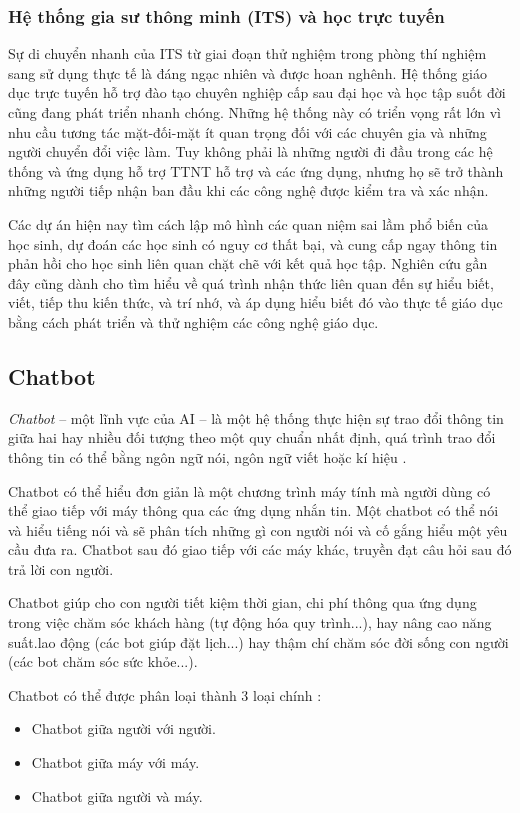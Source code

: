 \subsubsection{Hệ thống gia sư thông minh (ITS) và học trực tuyến}
Sự di chuyển nhanh của ITS từ giai đoạn thử nghiệm trong phòng thí nghiệm sang sử dụng thực tế là đáng ngạc nhiên và được hoan nghênh. Hệ thống giáo dục trực tuyến hỗ trợ đào tạo chuyên nghiệp cấp sau đại học và học tập suốt đời cũng đang phát triển nhanh chóng. Những hệ thống này có triển vọng rất lớn vì nhu cầu tương tác mặt-đối-mặt ít quan trọng đối với các chuyên gia và những người chuyển đổi việc làm. Tuy không phải là những người đi đầu trong các hệ thống và ứng dụng hỗ trợ TTNT hỗ trợ và các ứng dụng, nhưng họ sẽ trở thành những người tiếp nhận ban đầu khi các công nghệ được kiểm tra và xác nhận.\par
Các dự án hiện nay tìm cách lập mô hình các quan niệm sai lầm phổ biến của học sinh, dự đoán các học sinh có nguy cơ thất bại, và cung cấp ngay thông tin phản hồi cho học sinh liên quan chặt chẽ với kết quả học tập. Nghiên cứu gần đây cũng dành cho tìm hiểu về quá trình nhận thức liên quan đến sự hiểu biết, viết, tiếp thu kiến thức, và trí nhớ, và áp dụng hiểu biết đó vào thực tế giáo dục bằng cách phát triển và thử nghiệm các công nghệ giáo dục.

\subsection{Chatbot}
\textit{Chatbot} – một lĩnh vực của AI – là một hệ thống thực hiện sự trao đổi thông tin giữa hai hay nhiều đối tượng theo một quy chuẩn nhất định, quá trình trao đổi thông tin có thể bằng ngôn ngữ nói, ngôn ngữ viết hoặc kí hiệu \cite{hoang2011ung}.\par
Chatbot có thể hiểu đơn giản là một chương trình máy tính mà người dùng có thể giao tiếp với máy thông qua các ứng dụng nhắn tin. Một chatbot có thể nói và hiểu tiếng nói và sẽ phân tích những gì con người nói và cố gắng hiểu một yêu cầu đưa ra. Chatbot sau đó giao tiếp với các máy khác, truyền đạt câu hỏi sau đó trả lời con người.\par
Chatbot giúp cho con người tiết kiệm thời gian, chi phí thông qua ứng dụng trong việc chăm sóc khách hàng (tự động hóa quy trình...), hay nâng cao năng suất.lao động (các bot giúp đặt lịch...) hay thậm chí chăm sóc đời sống con người (các bot chăm sóc sức khỏe...).\par
Chatbot có thể được phân loại thành 3 loại chính \cite{hoang2011ung}:
\begin{itemize}
	\item Chatbot giữa người với người.
	\item Chatbot giữa máy với máy.
	\item Chatbot giữa người và máy.
\end{itemize}\par

